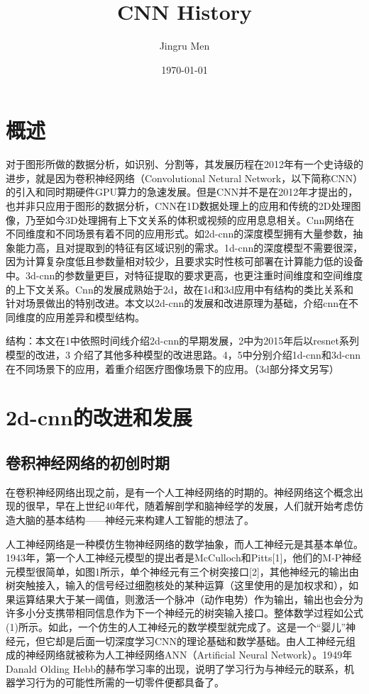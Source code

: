 \documentclass[15pt]{article}
\title{CNN History}
\author{Jingru Men}
\date{\today}
\begin{document}
\maketitle
\tableofcontents
\section{概述}
对于图形所做的数据分析，如识别、分割等，其发展历程在2012年有一个史诗级的进步，就是因为卷积神经网络（Convolutional Netural Network，以下简称CNN）的引入和同时期硬件GPU算力的急速发展。但是CNN并不是在2012年才提出的，也并非只应用于图形的数据分析，CNN在1D数据处理上的应用和传统的2D处理图像，乃至如今3D处理拥有上下文关系的体积或视频的应用息息相关。Cnn网络在不同维度和不同场景有着不同的应用形式。如2d-cnn的深度模型拥有大量参数，抽象能力高，且对提取到的特征有区域识别的需求。1d-cnn的深度模型不需要很深，因为计算复杂度低且参数量相对较少，且要求实时性核可部署在计算能力低的设备中。3d-cnn的参数量更巨，对特征提取的要求更高，也更注重时间维度和空间维度的上下文关系。Cnn的发展成熟始于2d，故在1d和3d应用中有结构的类比关系和针对场景做出的特别改进。本文以2d-cnn的发展和改进原理为基础，介绍cnn在不同维度的应用差异和模型结构。

结构：本文在1中依照时间线介绍2d-cnn的早期发展，2中为2015年后以resnet系列模型的改进，3 介绍了其他多种模型的改进思路。4，5中分别介绍1d-cnn和3d-cnn在不同场景下的应用，着重介绍医疗图像场景下的应用。（3d部分择文另写） 

\section{2d-cnn的改进和发展}
\subsection{卷积神经网络的初创时期}
在卷积神经网络出现之前，是有一个人工神经网络的时期的。神经网络这个概念出现的很早，早在上世纪40年代，随着解剖学和脑神经学的发展，人们就开始考虑仿造大脑的基本结构——神经元来构建人工智能的想法了。

人工神经网络是一种模仿生物神经网络的数学抽象，而人工神经元是其基本单位。1943年，第一个人工神经元模型的提出者是McCulloch和Pitts[1]，他们的M-P神经元模型很简单，如图1所示，单个神经元有三个树突接口[2]，其他神经元的输出由树突触接入，输入的信号经过细胞核处的某种运算（这里使用的是加权求和），如果运算结果大于某一阈值，则激活一个脉冲（动作电势）作为输出，输出也会分为许多小分支携带相同信息作为下一个神经元的树突输入接口。整体数学过程如公式(1)所示。如此，一个仿生的人工神经元的数学模型就完成了。这是一个“婴儿”神经元，但它却是后面一切深度学习CNN的理论基础和数学基础。由人工神经元组成的神经网络就被称为人工神经网络ANN（Artificial Neural Network）。1949年Danald Olding Hebb的赫布学习率的出现，说明了学习行为与神经元的联系，机器学习行为的可能性所需的一切零件便都具备了。
\end{document}

